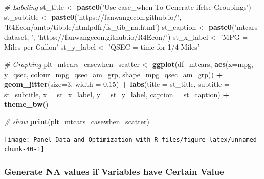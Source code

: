 \documentclass[
]{book}
\newenvironment{Shaded}{\begin{snugshade}}{\end{snugshade}}
\newcommand{\CommentTok}[1]{\textcolor[rgb]{0.56,0.35,0.01}{\textit{#1}}}
\newcommand{\DataTypeTok}[1]{\textcolor[rgb]{0.13,0.29,0.53}{#1}}
\newcommand{\DecValTok}[1]{\textcolor[rgb]{0.00,0.00,0.81}{#1}}
\newcommand{\FloatTok}[1]{\textcolor[rgb]{0.00,0.00,0.81}{#1}}
\newcommand{\KeywordTok}[1]{\textcolor[rgb]{0.13,0.29,0.53}{\textbf{#1}}}
\newcommand{\NormalTok}[1]{#1}
\newcommand{\OperatorTok}[1]{\textcolor[rgb]{0.81,0.36,0.00}{\textbf{#1}}}
\newcommand{\StringTok}[1]{\textcolor[rgb]{0.31,0.60,0.02}{#1}}
\begin{document}
\begin{Shaded}
\begin{Highlighting}[]
\CommentTok{# Labeling}
\NormalTok{st_title <-}\StringTok{ }\KeywordTok{paste0}\NormalTok{(}\StringTok{'Use case_when To Generate ifelse Groupings'}\NormalTok{)}
\NormalTok{st_subtitle <-}\StringTok{ }\KeywordTok{paste0}\NormalTok{(}\StringTok{'https://fanwangecon.github.io/'}\NormalTok{,}
                      \StringTok{'R4Econ/amto/tibble/htmlpdfr/fs_tib_na.html'}\NormalTok{)}
\NormalTok{st_caption <-}\StringTok{ }\KeywordTok{paste0}\NormalTok{(}\StringTok{'mtcars dataset, '}\NormalTok{,}
                     \StringTok{'https://fanwangecon.github.io/R4Econ/'}\NormalTok{)}
\NormalTok{st_x_label <-}\StringTok{ 'MPG = Miles per Gallon'}
\NormalTok{st_y_label <-}\StringTok{ 'QSEC = time for 1/4 Miles'}

\CommentTok{# Graphing}
\NormalTok{plt_mtcars_casewhen_scatter <-}\StringTok{ }
\StringTok{  }\KeywordTok{ggplot}\NormalTok{(df_mtcars, }
         \KeywordTok{aes}\NormalTok{(}\DataTypeTok{x=}\NormalTok{mpg, }\DataTypeTok{y=}\NormalTok{qsec, }
             \DataTypeTok{colour=}\NormalTok{mpg_qsec_am_grp, }
             \DataTypeTok{shape=}\NormalTok{mpg_qsec_am_grp)) }\OperatorTok{+}
\StringTok{  }\KeywordTok{geom_jitter}\NormalTok{(}\DataTypeTok{size=}\DecValTok{3}\NormalTok{, }\DataTypeTok{width =} \FloatTok{0.15}\NormalTok{) }\OperatorTok{+}
\StringTok{  }\KeywordTok{labs}\NormalTok{(}\DataTypeTok{title =}\NormalTok{ st_title, }\DataTypeTok{subtitle =}\NormalTok{ st_subtitle,}
       \DataTypeTok{x =}\NormalTok{ st_x_label, }\DataTypeTok{y =}\NormalTok{ st_y_label, }\DataTypeTok{caption =}\NormalTok{ st_caption) }\OperatorTok{+}
\StringTok{  }\KeywordTok{theme_bw}\NormalTok{()}

\CommentTok{# show}
\KeywordTok{print}\NormalTok{(plt_mtcars_casewhen_scatter)}
\end{Highlighting}
\end{Shaded}

\begin{center}\texttt{[image: Panel-Data-and-Optimization-with-R\_files/figure-latex/unnamed-chunk-40-1]} \end{center}

\hypertarget{generate-na-values-if-variables-have-certain-value}{%
\subsubsection{Generate NA values if Variables have Certain Value}\label{generate-na-values-if-variables-have-certain-value}}
\end{document}
